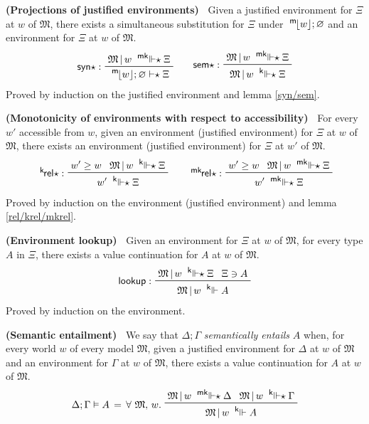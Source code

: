\documentclass{entcs}
\numberwithin{equation}{thm}
\newcommand{\tsf}[1]{\textsf{\upshape{#1}}}
\newcommand{\stsf}[1]{\tsf{\small{#1}}}
\renewcommand{\:}{\mathrel{:}}
\newcommand{\tyrule}[1]{\prftree[l]{${#1} \:\,$}}
\let\oldforall\forall
\renewcommand{\forall}{\oldforall\,}
\newcommand{\0}{\varnothing}
\newcommand{\es}{\mathrel{\vdash\mkern-5mu\star}}
\newcommand{\M}{\mathfrak{M}}
\newcommand{\mpeek}[1]{\mathopen{^{\stsf{m}\mkern-3mu}\lfloor}{#1}\mathclose{\rfloor}}
\newcommand{\kee}{\mathrel{^{\stsf{k}\mkern-6mu}\Vdash}}
\newcommand{\kees}{\mathrel{^{\stsf{k}\mkern-6mu}\Vdash\mkern-5mu\star}}
\newcommand{\mkees}{\mathrel{^{\stsf{mk}\mkern-6mu}\Vdash\mkern-5mu\star}}
\newcommand{\syns}{\operatorname{\tsf{syn}\star}}
\newcommand{\sems}{\operatorname{\tsf{sem}\star}}
\newcommand{\eeq}{\mathrel{\vDash}}
\newcommand{\krels}{\operatorname{^{\stsf{k}\mkern-2mu}\tsf{rel}\star}}
\newcommand{\mkrels}{\operatorname{^{\stsf{mk}\mkern-2mu}\tsf{rel}\star}}
\newcommand{\lookup}{\operatorname{\tsf{lookup}}}
\begin{document}
\begin{lemma}
  \normalshape
  \textbf{(Projections of justified environments)\ }
  \label{syns/sems}
  Given a justified environment for $\Xi$ at $w$ of $\M$, there exists a simultaneous substitution for $\Xi$ under $\mpeek{w}; \0$ and an environment for $\Xi$ at $w$ of $\M$.
  \begin{gather*}
    \tyrule{\syns}{\M\,|\, w \mkees \Xi}{\mpeek{w}; \0 \es \Xi}\qquad
    \tyrule{\sems}{\M\,|\, w \mkees \Xi}{\M\,|\, w \kees \Xi}
  \end{gather*}
  Proved by induction on the justified environment and lemma \ref{syn/sem}.
\end{lemma}

\begin{lemma}
  \normalshape
  \textbf{(Monotonicity of environments with respect to accessibility)\ }
  \label{krels/mkrels}
  For every $w'$ accessible from $w$, given an environment (justified environment) for $\Xi$ at $w$ of $\M$, there exists an environment (justified environment) for $\Xi$ at $w'$ of $\M$.
  \begin{gather*}
    \tyrule{\krels}{w' \ge w}{\M\,|\, w \kees \Xi}{w' \kees \Xi}\qquad
    \tyrule{\mkrels}{w' \ge w}{\M\,|\, w \mkees \Xi}{w' \mkees \Xi}
  \end{gather*}
  Proved by induction on the environment (justified environment) and lemma \ref{rel/krel/mkrel}.
\end{lemma}

\begin{lemma}
  \normalshape
  \textbf{(Environment lookup)\ }
  \label{lookup}
  Given an environment for $\Xi$ at $w$ of $\M$, for every type $A$ in $\Xi$, there exists a value continuation for $A$ at $w$ of $\M$.
  \begin{gather*}
    \tyrule{\lookup}{\M\,|\,w \kees \Xi}{\Xi \ni A}{\M\,|\,w \kee A}
  \end{gather*}
  Proved by induction on the environment.
\end{lemma}

\begin{definition}
  \textbf{(Semantic entailment)\ }
  \label{eeq}
  We say that $\Delta; \Gamma$ \emph{semantically entails} $A$ when, for every world $w$ of every model $\M$, given a justified environment for $\Delta$ at $w$ of $\M$ and an environment for $\Gamma$ at $w$ of $\M$, there exists a value continuation for $A$ at $w$ of $\M$.
  \begin{gather*}
    \Delta; \Gamma \eeq A \,=\, \forall \M,\,w.\ \raisebox{-8pt}{$\prftree{\M\,|\,w \mkees \Delta}{\M\,|\,w \kees \Gamma}{\M\,|\,w \kee A}$}
  \end{gather*}
\end{definition}
\end{document}
